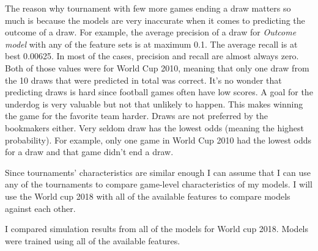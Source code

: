 The reason why tournament with few more games ending a draw matters so much is because the models are very inaccurate when it comes to predicting the outcome of a draw. For example, the average precision of a draw for \textit{Outcome model} with any of the feature sets is at maximum 0.1. The average recall is at best 0.00625. In most of the cases, precision and recall are almost always zero. Both of those values were for World Cup 2010, meaning that only one draw from the 10 draws that were predicted in total was correct. It's no wonder that predicting draws is hard since football games often have low scores. A goal for the underdog is very valuable but not that unlikely to happen. This makes winning the game for the favorite team harder. Draws are not preferred by the bookmakers either. Very seldom draw has the lowest odds (meaning the highest probability). For example, only one game in World Cup 2010 had the lowest odds for a draw and that game didn't end a draw.

Since tournaments' characteristics are similar enough I can assume that I can use any of the tournaments to compare game-level characteristics of my models. I will use the World cup 2018 with all of the available features to compare models against each other.

I compared simulation results from all of the models for World cup 2018. Models were trained using all of the available features.

